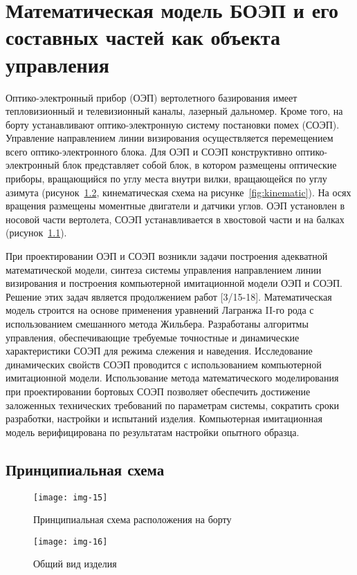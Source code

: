 \chapter{Математическая модель БОЭП и его составных частей как объекта управления} \label{ch:ch3}

Оптико-электронный прибор (ОЭП) вертолетного базирования имеет тепловизионный и телевизионный каналы, лазерный дальномер. Кроме того, на борту устанавливают оптико-электронную систему постановки помех (СОЭП).  Управление направлением линии визирования осуществляется перемещением всего оптико-электронного блока. Для ОЭП и СОЭП конструктивно оптико-электронный блок представляет собой блок, в котором размещены оптические приборы, вращающийся по углу места внутри вилки, вращающейся по углу азимута 
(рисунок~\ref{fig:device}, кинематическая схема на рисунке~\ref{fig:kinematic}). 
На осях вращения размещены моментные двигатели и датчики углов. ОЭП установлен в носовой части вертолета, СОЭП устанавливается в хвостовой части и на балках 
(рисунок~\ref{fig:helicopter}).

При проектировании ОЭП и СОЭП возникли задачи построения адекватной математической модели, синтеза системы управления направлением линии визирования и построения компьютерной имитационной модели ОЭП и СОЭП. Решение этих задач является продолжением работ [3/15-18]. Математическая модель строится на основе применения уравнений Лагранжа II-го рода с использованием смешанного метода Жильбера. Разработаны алгоритмы управления, обеспечивающие требуемые точностные и динамические характеристики СОЭП для режима слежения и наведения. Исследование динамических свойств СОЭП проводится с использованием компьютерной имитационной модели. Использование метода математического моделирования при проектировании бортовых СОЭП позволяет обеспечить достижение заложенных технических требований по параметрам системы, сократить сроки разработки, настройки и испытаний изделия. Компьютерная имитационная модель верифицирована по результатам настройки опытного образца.

\begin{landscape}
\section{Принципиальная схема} \label{ch:ch3/sect1}

\begin{figure}[ht]
	\centering
	\texttt{[image: img-15]} 
	\caption{Принципиальная схема расположения на борту}
	\label{fig:helicopter}
\end{figure}

\begin{figure}[ht]
	\centering
	\texttt{[image: img-16]} 
	\caption{Общий вид изделия}
	\label{fig:device}
\end{figure}
\end{landscape}

